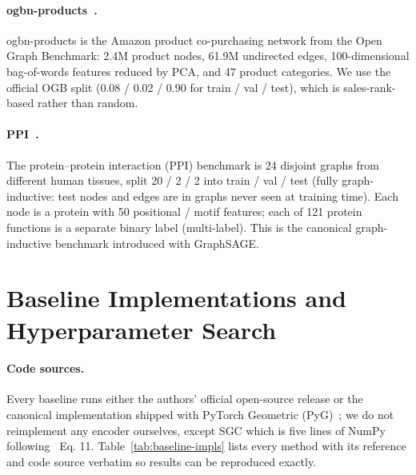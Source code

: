 \documentclass{article}
\begin{document}
\paragraph{ogbn-products~\citep{hu2020open}.}
ogbn-products is the Amazon product co-purchasing network from the Open
Graph Benchmark: 2.4M product nodes, 61.9M undirected edges, 100-dimensional
bag-of-words features reduced by PCA, and 47 product categories. We use the
official OGB split (0.08 / 0.02 / 0.90 for train / val / test), which is
sales-rank-based rather than random.

\paragraph{PPI~\citep{hamilton2017inductive}.}
The protein--protein interaction (PPI) benchmark is 24 disjoint graphs from
different human tissues, split 20 / 2 / 2 into train / val / test (fully
graph-inductive: test nodes and edges are in graphs never seen at training
time). Each node is a protein with 50 positional / motif features; each of
121 protein functions is a separate binary label (multi-label). This is the
canonical graph-inductive benchmark introduced with GraphSAGE.

\section{Baseline Implementations and Hyperparameter Search}
\label{app:baselines}

\paragraph{Code sources.}
Every baseline runs either the authors' official open-source release or
the canonical implementation shipped with PyTorch Geometric
(PyG)~\citep{fey2019pyg}; we do not reimplement any encoder ourselves,
except SGC which is five lines of NumPy following~\citet{wu2019simplifying}
Eq. 11. Table~\ref{tab:baseline-impls} lists every method with its
reference and code source verbatim so results can be reproduced exactly.
\end{document}
